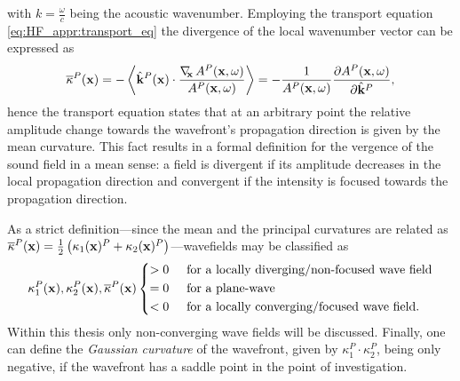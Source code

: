 %
with $k = \frac{\omega}{c}$ being the acoustic wavenumber.
Employing the transport equation \eqref{eq:HF_appr:transport_eq} the divergence of the local wavenumber vector can be expressed as
\begin{equation}
\overline{\kappa}^P(\mathbf{x})
= -\left< \hat{\mathbf{k}}^P(\mathbf{x})\cdot \frac{ \nabla_{\!\!\mathbf{x}}\, A^P(\mathbf{x},\omega) }{A^P(\mathbf{x},\omega)}\right>
= -\frac{ 1 }{ A^P(\mathbf{x},\omega)} \frac{\partial A^P(\mathbf{x},\omega)}{\partial \hat{\mathbf{k}}^P},
\end{equation}
hence the transport equation states that at an arbitrary point the relative amplitude change towards the wavefront's propagation direction is given by the mean curvature.
This fact results in a formal definition for the vergence of the sound field in a mean sense: a field is divergent if its amplitude decreases in the local propagation direction and convergent if the intensity is focused towards the propagation direction.

As a strict definition---since the mean and the principal curvatures are related as $\overline{\kappa}^P(\mathbf{x})  = \frac{1}{2} \left( \kappa_1(\mathbf{x})^P+\kappa_2(\mathbf{x})^P \right)$---wavefields may be classified as
\begin{equation}
\label{eq:HF_appr:curvature_cases}
\kappa_1^P(\vx),\kappa_2^P(\vx),\overline{\kappa}^P(\vx) 
\begin{cases*}
> 0  \hspace{5mm} \text{for a locally diverging/non-focused wave field} \\
= 0  \hspace{5mm} \text{for a plane-wave}  \\
< 0  \hspace{5mm} \text{for a locally converging/focused wave field.} 
\end{cases*}
\end{equation}
Within this thesis only non-converging wave fields will be discussed.
Finally, one can define the \emph{Gaussian curvature} of the wavefront, given by $\kappa^P_1 \cdot \kappa^P_2$, being only negative, if the wavefront has a saddle point in the point of investigation.

